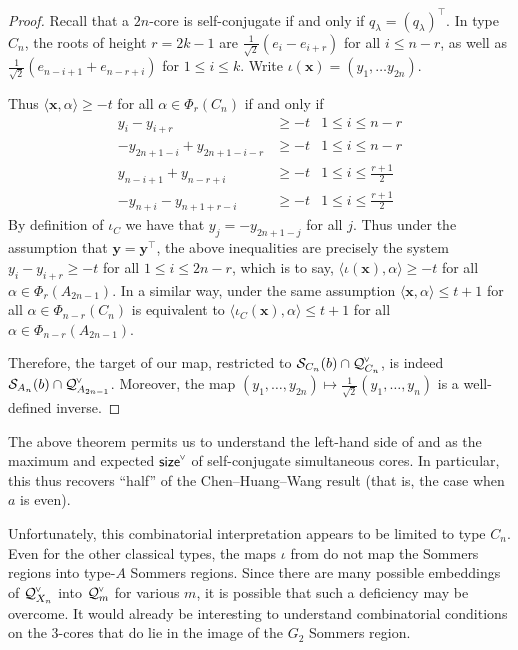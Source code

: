\documentclass[ALCO,published]{cedram}
\newcommand{\chk}[1]{#1^{\normalfont\smash{\scalebox{.5}[.5]{\rotatebox{90}{\textbf{\textless}}}}}}
\newcommand{\Q}{\mathcal{Q}}
\newcommand{\Sommers}{\mathcal{S}}
\newcommand{\size}{{\sf size}}
\begin{document}
\begin{proof}
Recall that a $2n$-core is self-conjugate if and only if $q_\lambda = (q_\lambda)^\intercal$. In type $C_n$, the roots of height $r=2k-1$ are $\frac{1}{\sqrt{2}}(e_i-e_{i+r})$ for all $i\leq n-r$, as well as $\frac{1}{\sqrt{2}}(e_{n-i+1} + e_{n-r+i})$ for $1\leq i\leq k$. Write $\iota(\mathbf{x})=(y_1,\dots y_{2n})$.

Thus  $\langle\mathbf{x},\alpha\rangle \geq -t $ for all $\alpha\in\Phi_r(C_n)$ if and only if 
\begin{align*}
y_i-y_{i+r} &\geq -t & 1\leq i\leq n-r \\
-y_{2n+1-i}+y_{2n+1-i-r} &\geq -t & 1\leq i\leq n-r \\
y_{n-i+1}+y_{n-r+i} &\geq -t & 1\leq i\leq \textstyle\frac{r+1}{2} \\
-y_{n+i}-y_{n+1+r-i} &\geq -t & 1\leq i\leq \textstyle\frac{r+1}{2}
\end{align*}
By definition of $\iota_C$ we have that $y_j=-y_{2n+1-j}$ for all $j$. Thus under the assumption that $\mathbf{y}=\mathbf{y}^\intercal$, the above inequalities are precisely the system $y_i-y_{i+r}\geq -t$ for all $1\leq i\leq 2n-r$, which is to say, $\langle\iota(\mathbf{x}),\alpha\rangle \geq -t$ for all $\alpha\in \Phi_r(A_{2n-1})$. In a similar way, under the same assumption $\langle\mathbf{x},\alpha\rangle \leq t+1$ for all $\alpha\in \Phi_{n-r}(C_n)$ is equivalent to $\langle\iota_C(\mathbf{x}),\alpha\rangle \leq t+1$ for all $\alpha\in \Phi_{n-r}(A_{2n-1})$.

Therefore, the target of our map, restricted to $\Sommers_{C_n}(b)\cap \chk{\Q}_{C_n}$, is indeed $\Sommers_{A_n}(b)\cap \chk{\Q}_{A_{2n-1}}$. Moreover, the map $(y_1,\dots, y_{2n})\mapsto \frac{1}{\sqrt{2}}(y_1,\dots, y_n)$ is a well-defined inverse.
\end{proof}

The above theorem permits us to understand the left-hand side of  and  as the maximum and expected $\chk{\size}$ of self-conjugate simultaneous cores.  In particular, this thus recovers ``half'' of the Chen--Huang--Wang result (that is, the case when $a$ is even). 

Unfortunately, this combinatorial interpretation appears to be limited to type $C_n$.  Even for the other classical types, the maps $\iota$ from  do not map the Sommers regions into type-$A$ Sommers regions. Since there are many possible embeddings of $\chk{\Q}_{X_n}$ into $\chk{\Q}_m$ for various $m$, it is possible that such a deficiency may be overcome. It would already be interesting to understand combinatorial conditions on the $3$-cores that do lie in the image of the $G_2$ Sommers region.
\end{document}
